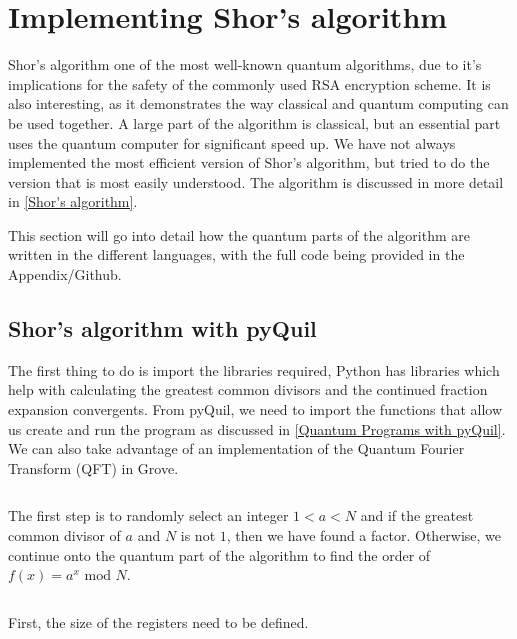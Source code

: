 \section{Implementing Shor's algorithm}


Shor's algorithm one of the most well-known quantum algorithms, due to it's implications for the safety of the commonly used RSA encryption scheme. It is also interesting, as it demonstrates the way classical and quantum computing can be used together. A large part of the algorithm is classical, but an essential part uses the quantum computer for significant speed up. We have not always implemented the most efficient version of Shor's algorithm, but tried to do the version that is most easily understood. The algorithm is discussed in more detail in \autoref{Shor's algorithm}.

This section will go into detail how the quantum parts of the algorithm are written in the different languages, with the full code being provided in the Appendix/Github.

\subsection{Shor's algorithm with pyQuil}

The first thing to do is import the libraries required, Python has libraries which help with calculating the greatest common divisors and the continued fraction expansion convergents. From pyQuil, we need to import the functions that allow us create and run the program as discussed in \autoref{Quantum Programs with pyQuil}. We can also take advantage of an implementation of the Quantum Fourier Transform (QFT) in Grove. 

\inputminted[lastline=7]{python}{code/pyQuil/shor_pyquil_guide.txt}

The first step is to randomly select an integer $1 < a < N$ and if the greatest common divisor of $a$ and $N$ is not $1$, then we have found a factor. Otherwise, we continue onto the quantum part of the algorithm to find the order of $f(x) = a^x \text{ mod } N$. 

\inputminted[firstnumber=31, firstline=31, lastline=38]{python}{code/pyQuil/shor_pyquil_guide.txt}

First, the size of the registers need to be defined.

\inputminted[firstnumber=43, firstline=43, lastline=45]{python}{code/pyQuil/shor_pyquil_guide.txt}


